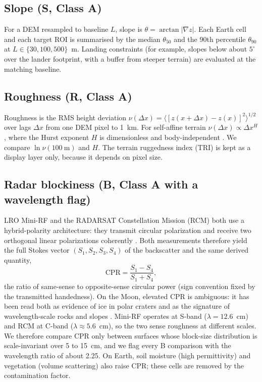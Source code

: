 \documentclass[11pt,a4paper]{article}
\begin{document}
\subsection{Slope (S, Class A)}
For a DEM resampled to baseline $L$, slope is $\theta=\arctan\lvert\nabla z\rvert$. Each Earth cell and each target ROI is summarised by the median $\theta_{50}$ and the 90th percentile $\theta_{90}$ at $L\in\{30, 100, 500\}$~m. Landing constraints (for example, slopes below about $5^\circ$ over the lander footprint, with a buffer from steeper terrain) are evaluated at the matching baseline.

\subsection{Roughness (R, Class A)}
Roughness is the RMS height deviation $\nu(\Delta x)=\langle[z(x+\Delta x)-z(x)]^2\rangle^{1/2}$ over lags $\Delta x$ from one DEM pixel to 1~km. For self-affine terrain $\nu(\Delta x)\propto\Delta x^{H}$, where the Hurst exponent $H$ is dimensionless and body-independent \citep{shepard2001,rosenburg2011}. We compare $\ln \nu(100~\mathrm{m})$ and $H$. The terrain ruggedness index (TRI) \citep{riley1999} is kept as a display layer only, because it depends on pixel size.

\subsection{Radar blockiness (B, Class A with a wavelength flag)}
LRO Mini-RF and the RADARSAT Constellation Mission (RCM) both use a hybrid-polarity architecture: they transmit circular polarization and receive two orthogonal linear polarizations coherently \citep{raney2007,brisco2020}. Both measurements therefore yield the full Stokes vector $(S_1,S_2,S_3,S_4)$ of the backscatter and the same derived quantity,
\begin{equation*}
\mathrm{CPR}=\frac{S_1-S_4}{S_1+S_4}, \tag{2}
\end{equation*}
the ratio of same-sense to opposite-sense circular power (sign convention fixed by the transmitted handedness). On the Moon, elevated CPR is ambiguous: it has been read both as evidence of ice in polar craters \citep{spudis2013} and as the signature of wavelength-scale rocks and slopes \citep{fa2013,eke2014,thomson2012}. Mini-RF operates at S-band ($\lambda=12.6$~cm) and RCM at C-band ($\lambda\approx5.6$~cm), so the two sense roughness at different scales. We therefore compare CPR only between surfaces whose block-size distribution is scale-invariant over 5 to 15~cm, and we flag every B comparison with the wavelength ratio of about 2.25. On Earth, soil moisture (high permittivity) and vegetation (volume scattering) also raise CPR; these cells are removed by the contamination factor.
\end{document}
